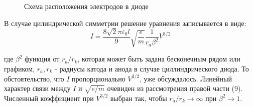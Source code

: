 \documentclass[a4paper,12pt]{article}
\begin{document}
\begin{figure}
	\centering
	\caption{Схема расположения электродов в диоде}
	\label{mah}
	\vspace{-2cm}
\end{figure}

\par В случае цилиндрической симметрии решение уравнения записывается в виде:
\begin{equation}
I = \frac{8 \sqrt{2} \pi \varepsilon_0 l}{9} \sqrt{\frac{e}{m}} \frac{1}{r_a \beta^2} V^{3/2}
\end{equation}
\par где $\beta^2$ функция от $r_a/r_k$, которая может быть задана бесконечным рядом или графиком, $r_a,r_k$ - радиусы катода и анода в случае циллиндрического диода. То обстоятельство, что $I$ пропорционально $V^{3/2}$, уже обсуждалось. Линейный характер связи между $I$ и $\sqrt{e/m}$ очевиден из рассмотрения правой части (9). Численный коэффициент при $V^{3/2}$ выбран так, чтобы $r_a/r_k \to \infty$ при $\beta^2 \to 1$.
\end{document}
